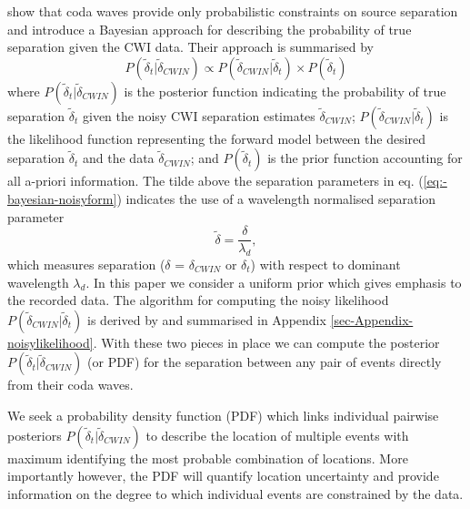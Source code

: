 \documentclass[extra, onecolumn, doublespacing]{gji}
\begin{document}
\citet{dr_Robinson11a} show that coda waves provide only
probabilistic constraints on source separation and introduce a
Bayesian approach for describing the probability of true separation
given the CWI data. Their approach is summarised by
\begin{equation}
\label{eq:-bayesian-noisyform}
P(\widetilde{\delta}_t|\widetilde{\delta}_{CWIN}) \propto P(\widetilde{\delta}_{CWIN}|\widetilde{\delta}_t)
\times P(\widetilde{\delta}_t)
\end{equation}
where  $P(\widetilde{\delta}_t|\widetilde{\delta}_{CWIN})$ is the posterior function
indicating the probability of true separation $\widetilde{\delta}_t$ given the noisy CWI separation
estimates $\widetilde{\delta}_{CWIN}$; $P(\widetilde{\delta}_{CWIN}|\widetilde{\delta}_t)$
is the likelihood function representing the forward model between the
desired separation $\widetilde{\delta}_t$ and the data $\widetilde{\delta}_{CWIN}$; and
$P(\widetilde{\delta}_t)$ is the prior function accounting for all a-priori information.
The tilde above the separation parameters in eq. (\ref{eq:-bayesian-noisyform})
indicates the use of a wavelength normalised separation parameter
\begin{equation}
\label{eq-normalisation-eqn}
\widetilde{\delta} = \frac{\delta}{\lambda_{d}},
\end{equation}
which measures separation ($\delta$ = $\delta_{CWIN}$ or $\delta_t$)
with respect to dominant wavelength $\lambda_{d}$. In this paper we
consider a uniform prior which gives emphasis to the recorded data.
The algorithm for computing the noisy likelihood
$P(\widetilde{\delta}_{CWIN}|\widetilde{\delta}_t)$ is derived by
\citet{dr_Robinson11a} and summarised in Appendix
\ref{sec-Appendix-noisylikelihood}. With these two pieces in place
we can compute the posterior
$P(\widetilde{\delta}_t|\widetilde{\delta}_{CWIN})$ (or PDF) for the
separation between any pair of events directly from their coda
waves.

We seek a probability density function (PDF) which links
 individual pairwise posteriors $P(\widetilde{\delta}_t|\widetilde{\delta}_{CWIN})$
to describe the location of multiple events with maximum identifying
 the most probable combination of locations.
More importantly however, the PDF will
quantify location uncertainty and provide information
on the degree to which individual events are constrained
 by the data.
\end{document}
